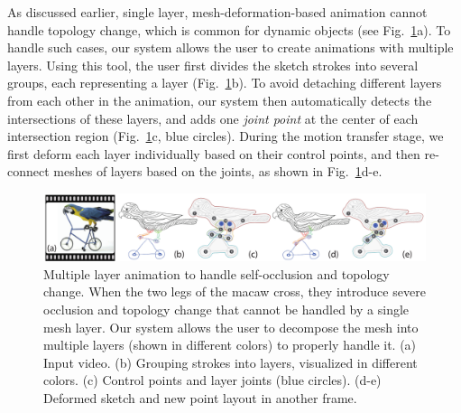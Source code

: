 As discussed earlier, single layer, mesh-deformation-based animation cannot handle topology change, which is common for dynamic objects (see Fig.~\ref{fig:multilayer}a). 
To handle such cases, our system allows the user to create animations with multiple layers. 
Using this tool, the user first divides the sketch strokes into several groups, each representing a layer (Fig.~\ref{fig:multilayer}b).
To avoid detaching different layers from each other in the animation, our system then automatically detects the intersections of these layers, and adds one {\em joint point} at the center of each intersection region (Fig.~\ref{fig:multilayer}c, blue circles). 
During the motion transfer stage, we first deform each layer individually based on their control points, and then re-connect meshes of layers based on the joints, as shown in Fig.~\ref{fig:multilayer}d-e. 
\begin{figure}
	\centering
	\includegraphics[width=\linewidth]{images/multilayer2}
	\caption{Multiple layer animation to handle self-occlusion and topology change. When the two legs of the macaw cross, they  introduce severe occlusion and topology change that cannot be handled by a single mesh layer. Our system allows the user to decompose the mesh into multiple layers (shown in different colors) to properly handle it. (a) Input video. (b) Grouping strokes into layers, visualized in different colors. (c) Control points and layer joints (blue circles). (d-e) Deformed sketch and new point layout in another frame.}
	\label{fig:multilayer}
\end{figure}



